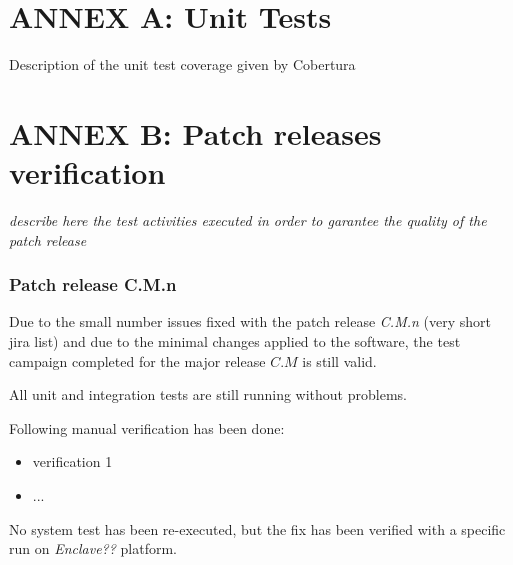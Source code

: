\documentclass[DM,lsstdraft,STR,toc]{lsstdoc}
\begin{document}







\newpage
\section{ANNEX A: Unit Tests \label{sect:unit_tests}}
Description of the unit test coverage given by Cobertura

\newpage
\section{ANNEX B: Patch releases verification}

{\it describe here the test activities executed in order to garantee the quality of the patch release}

\subsubsection{Patch release C.M.n}

Due to the small number issues fixed with the {\it \product} patch release {\it C.M.n} (very short jira list)
and due to the minimal changes applied to the software, the test campaign completed for the {\it \product} major
release $C.M$ is still valid.

All unit and integration tests are still running without problems.

Following manual verification has been done:

\begin{itemize}
\item verification 1
\item ...
\end{itemize}

No system test has been re-executed, but the fix has been verified with a specific run
on {\it Enclave??} platform.
\end{document}
